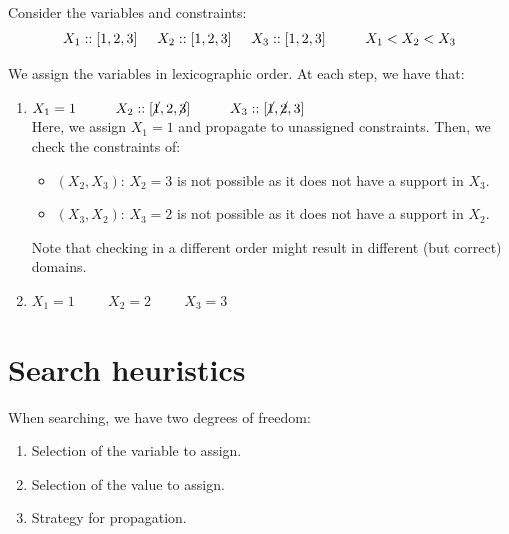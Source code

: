 \begin{description}
        \begin{example}
            Consider the variables and constraints: 
            \[ X_1 :: [1, 2, 3] \hspace{0.5cm} X_2 :: [1, 2, 3] \hspace{0.5cm} X_3 :: [1, 2, 3]  \hspace{1cm}  X_1 < X_2 < X_3 \]

            We assign the variables in lexicographic order. At each step, we have that:
            \begin{enumerate}
                \item $X_1 = 1 \hspace{1cm} X_2 :: [\cancel{1}, 2, \cancel{3}] \hspace{1cm} X_3 :: [\cancel{1}, \cancel{2}, 3]$ \\
                    Here, we assign $X_1=1$ and propagate to unassigned constraints.
                    Then, we check the constraints of:
                    \begin{itemize}
                        \item $(X_2, X_3)$: $X_2 = 3$ is not possible as it does not have a support in $X_3$.
                        \item $(X_3, X_2)$: $X_3 = 2$ is not possible as it does not have a support in $X_2$.
                    \end{itemize} 
                    Note that checking in a different order might result in different (but correct) domains.
                \item $X_1 = 1 \hspace{1cm} X_2 = 2 \hspace{1cm} X_3 = 3$
            \end{enumerate}
        \end{example}
\end{description}



\section{Search heuristics}
When searching, we have two degrees of freedom:
\begin{enumerate}
    \item Selection of the variable to assign.
    \item Selection of the value to assign.
    \item Strategy for propagation.
\end{enumerate}

